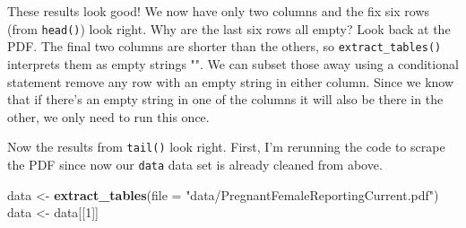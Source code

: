 \documentclass[
  12pt,
]{book}
\newenvironment{Shaded}{\begin{snugshade}}{\end{snugshade}}
\newcommand{\CommentTok}[1]{\textcolor[rgb]{0.37,0.37,0.37}{\textit{#1}}}
\newcommand{\DataTypeTok}[1]{\textcolor[rgb]{0.27,0.27,0.27}{#1}}
\newcommand{\DecValTok}[1]{\textcolor[rgb]{0.06,0.06,0.06}{#1}}
\newcommand{\KeywordTok}[1]{\textcolor[rgb]{0.27,0.27,0.27}{\textbf{#1}}}
\newcommand{\NormalTok}[1]{#1}
\newcommand{\OperatorTok}[1]{\textcolor[rgb]{0.43,0.43,0.43}{\textbf{#1}}}
\newcommand{\StringTok}[1]{\textcolor[rgb]{0.5,0.5,0.5}{#1}}
\begin{document}
These results look good! We now have only two columns and the fix six rows (from \texttt{head()}) look right. Why are the last six rows all empty? Look back at the PDF. The final two columns are shorter than the others, so \texttt{extract\_tables()} interprets them as empty strings "". We can subset those away using a conditional statement remove any row with an empty string in either column. Since we know that if there's an empty string in one of the columns it will also be there in the other, we only need to run this once.

\begin{Shaded}
\end{Shaded}

Now the results from \texttt{tail()} look right. First, I'm rerunning the code to scrape the PDF since now our \texttt{data} data set is already cleaned from above.

\begin{Shaded}
\begin{Highlighting}[]
\NormalTok{data \textless{}{-}}\StringTok{ }\KeywordTok{extract\_tables}\NormalTok{(}\DataTypeTok{file =} \StringTok{"data/PregnantFemaleReportingCurrent.pdf"}\NormalTok{)}
\NormalTok{data \textless{}{-}}\StringTok{ }\NormalTok{data[[}\DecValTok{1}\NormalTok{]]}
\end{Highlighting}
\end{Shaded}
\end{document}
